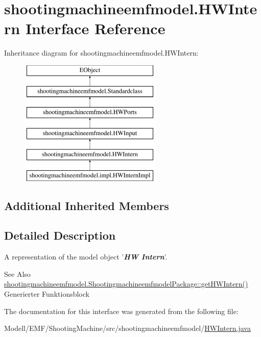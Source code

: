 \hypertarget{interfaceshootingmachineemfmodel_1_1_h_w_intern}{\section{shootingmachineemfmodel.\-H\-W\-Intern Interface Reference}
\label{interfaceshootingmachineemfmodel_1_1_h_w_intern}
}
Inheritance diagram for shootingmachineemfmodel.\-H\-W\-Intern\-:\begin{figure}[H]
\begin{center}
\leavevmode
\includegraphics[height=6.000000cm]{interfaceshootingmachineemfmodel_1_1_h_w_intern}
\end{center}
\end{figure}
\subsection*{Additional Inherited Members}


\subsection{Detailed Description}
A representation of the model object '{\itshape {\bfseries H\-W Intern}}'.

\begin{DoxySeeAlso}{See Also}
\hyperlink{interfaceshootingmachineemfmodel_1_1_shootingmachineemfmodel_package_a44d43825d205aa22ca7b8ac2cfaef00d}{shootingmachineemfmodel.\-Shootingmachineemfmodel\-Package\-::get\-H\-W\-Intern()}  Generierter Funktionsblock 
\end{DoxySeeAlso}


The documentation for this interface was generated from the following file\-:\begin{DoxyCompactItemize}
\item 
Modell/\-E\-M\-F/\-Shooting\-Machine/src/shootingmachineemfmodel/\hyperlink{_h_w_intern_8java}{H\-W\-Intern.\-java}\end{DoxyCompactItemize}
